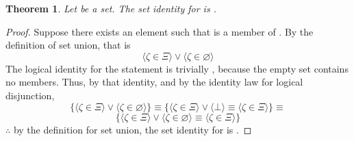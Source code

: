 \documentclass[preview]{standalone}
\newtheorem{theorem}{Theorem}
\begin{document}
\begin{theorem} %
    Let \bm{$\Xi$} be a set. 
    The set identity for \bm{$\Xi$} is \bm{$\Xi \cup \varnothing = \Xi$}.
\end{theorem}
\begin{proof}
    Suppose there exists an element \bm{$\zeta$} such that \bm{$\zeta$} is a member of 
    \bm{$\Xi \cup \varnothing$}. 
    By the definition of set union, that is 
    \begin{equation*}
        \Big \langle \zeta \in \Xi \Big \rangle 
            \lor 
        \Big \langle \zeta \in \varnothing \Big \rangle
    \end{equation*}
    The logical identity for the statement \bm{$\zeta \in \varnothing$} is trivially \bm{$\bot$}, 
    because the empty set contains no members. 
    Thus, by that identity, and by the identity law for logical disjunction,
    \begin{equation*} 
        \Bigg\{
            \Big \langle \zeta \in \Xi \Big \rangle 
                \lor 
            \Big \langle \zeta \in \varnothing \Big \rangle
        \Bigg\} 
            \equiv
        \Bigg\{
            \Big \langle \zeta \in \Xi \Big \rangle 
                \lor
            \Big \langle \bot \Big \rangle 
                \equiv
            \Big \langle \zeta \in \Xi \Big \rangle
        \Bigg\}
            \equiv
    \end{equation*}
    \begin{equation*} 
        \Bigg\{
            \Big \langle \zeta \in \Xi \Big \rangle 
                \lor 
            \Big \langle \zeta \in \varnothing \Big \rangle
                \equiv
            \Big \langle \zeta \in \Xi \Big \rangle
        \Bigg\}
    \end{equation*}
    $\therefore$ 
    by the definition for set union,
    the set identity for \bm{$\Xi$} is \bm{$\Xi \cup \varnothing = \Xi$}.
\end{proof}
\end{document}
